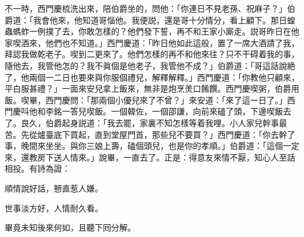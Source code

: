 不一時，西門慶梳洗出來，陪伯爵坐的，問他：「你連日不見老孫、祝麻子？」伯爵道：「我會他來，他知道哥惱他。我便説，還是哥十分情分，看上顧下。那日蝗蟲螞蚱一例撲了去，你敢怎樣的？他們發下誓，再不和王家小廝走。説哥昨日在他家喫酒來，他們也不知道。」西門慶道：「昨日他如此這般，置了一席大酒請了我，拜認我做乾老子。喫到二更來了。他們怎樣的再不和他來往？只不干碍着我的事，隨他去，我管他怎的？我不眞個是他老子，我管他不成？」伯爵道：「哥這話說絶了，他兩個一二日也要來與你服個禮兒，解釋解釋。」西門慶道：「你教他只顧來，平白服甚禮？」一面來安兒拿上飯來，無非是炮烹羙口餚饌。西門慶喫粥，伯爵用飯。喫畢，西門慶問：「那兩個小優兒來了不曾？」來安道：「來了這一日了。」西門慶呌他和李銘一答兒喫飯。一個韓佐，一個邵謙，向前來磕了頭，下邊喫飯去了。良久，伯爵起身説道：「我去罷，家裏不知怎樣等着我哩。小人家兒幹事最苦。先從爐臺底下買起，直到堂屋門首，那些兒不要買？」西門慶道：「你去幹了事，晚間來坐坐。與你三娘上壽，磕個頭兒，也是你的孝順。」伯爵道：「這個一定來，還教房下送人情來。」說畢，一直去了。正是：得意友來情不厭，知心人至話相投。有詩為證：

\begin{myquote}
順情說好話，戅直惹人嫌。

世事淡方好，人情耐久看。
\end{myquote}

畢竟未知後來何如，且聽下囘分解。

